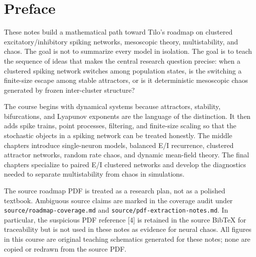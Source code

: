 \chapter{Preface}

These notes build a mathematical path toward Tilo's roadmap on clustered
excitatory/inhibitory spiking networks, mesoscopic theory, multistability, and
chaos. The goal is not to summarize every model in isolation. The goal is to
teach the sequence of ideas that makes the central research question precise:
when a clustered spiking network switches among population states, is the
switching a finite-size escape among stable attractors, or is it deterministic
mesoscopic chaos generated by frozen inter-cluster structure?

The course begins with dynamical systems because attractors, stability,
bifurcations, and Lyapunov exponents are the language of the distinction. It
then adds spike trains, point processes, filtering, and finite-size scaling so
that the stochastic objects in a spiking network can be treated honestly. The
middle chapters introduce single-neuron models, balanced E/I recurrence,
clustered attractor networks, random rate chaos, and dynamic mean-field theory.
The final chapters specialize to paired E/I clustered networks and develop the
diagnostics needed to separate multistability from chaos in simulations.

The source roadmap PDF is treated as a research plan, not as a polished
textbook. Ambiguous source claims are marked in the coverage audit under
\texttt{source/roadmap-coverage.md} and \texttt{source/pdf-extraction-notes.md}.
In particular, the suspicious PDF reference [4] is retained in the source
BibTeX for traceability but is not used in these notes as evidence for neural
chaos. All figures in this course are original teaching schematics generated
for these notes; none are copied or redrawn from the source PDF.
